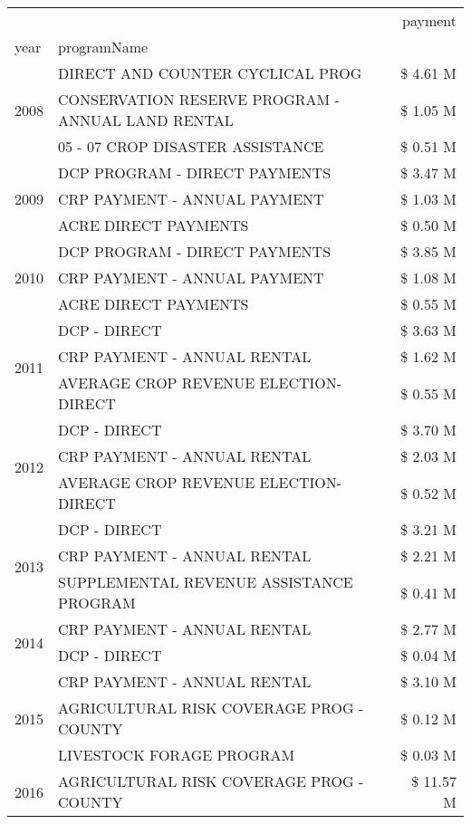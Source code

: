 \begin{tabular}{llr}
\toprule
 &  & payment \\
year & programName &  \\
\midrule
\multirow[t]{3}{*}{2008} & DIRECT AND COUNTER CYCLICAL PROG & \$ 4.61 M \\
 & CONSERVATION RESERVE PROGRAM - ANNUAL LAND RENTAL & \$ 1.05 M \\
 & 05 - 07 CROP DISASTER ASSISTANCE & \$ 0.51 M \\
\cline{1-3}
\multirow[t]{3}{*}{2009} & DCP PROGRAM - DIRECT PAYMENTS & \$ 3.47 M \\
 & CRP PAYMENT - ANNUAL PAYMENT & \$ 1.03 M \\
 & ACRE DIRECT PAYMENTS & \$ 0.50 M \\
\cline{1-3}
\multirow[t]{3}{*}{2010} & DCP PROGRAM - DIRECT PAYMENTS & \$ 3.85 M \\
 & CRP PAYMENT - ANNUAL PAYMENT & \$ 1.08 M \\
 & ACRE DIRECT PAYMENTS & \$ 0.55 M \\
\cline{1-3}
\multirow[t]{3}{*}{2011} & DCP - DIRECT & \$ 3.63 M \\
 & CRP PAYMENT - ANNUAL RENTAL & \$ 1.62 M \\
 & AVERAGE CROP REVENUE ELECTION-DIRECT & \$ 0.55 M \\
\cline{1-3}
\multirow[t]{3}{*}{2012} & DCP - DIRECT & \$ 3.70 M \\
 & CRP PAYMENT - ANNUAL RENTAL & \$ 2.03 M \\
 & AVERAGE CROP REVENUE ELECTION-DIRECT & \$ 0.52 M \\
\cline{1-3}
\multirow[t]{3}{*}{2013} & DCP - DIRECT & \$ 3.21 M \\
 & CRP PAYMENT - ANNUAL RENTAL & \$ 2.21 M \\
 & SUPPLEMENTAL REVENUE ASSISTANCE PROGRAM & \$ 0.41 M \\
\cline{1-3}
\multirow[t]{2}{*}{2014} & CRP PAYMENT - ANNUAL RENTAL & \$ 2.77 M \\
 & DCP - DIRECT & \$ 0.04 M \\
\cline{1-3}
\multirow[t]{3}{*}{2015} & CRP PAYMENT - ANNUAL RENTAL & \$ 3.10 M \\
 & AGRICULTURAL RISK COVERAGE PROG - COUNTY & \$ 0.12 M \\
 & LIVESTOCK FORAGE PROGRAM & \$ 0.03 M \\
\cline{1-3}
\multirow[t]{3}{*}{2016} & AGRICULTURAL RISK COVERAGE PROG - COUNTY      & \$ 11.57 M \\

\end{tabular}
